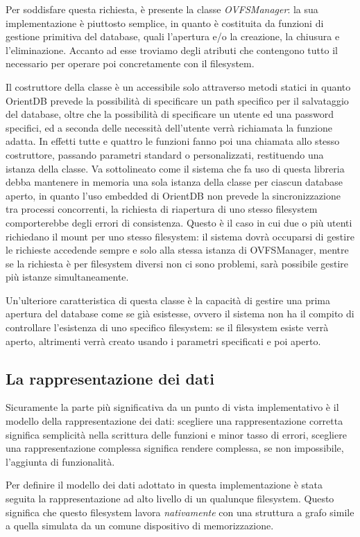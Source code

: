 Per soddisfare questa richiesta, è presente la classe \emph{OVFSManager}: la sua implementazione è piuttosto semplice, in quanto è costituita da funzioni di gestione primitiva del database, quali l'apertura e/o la creazione, la chiusura e l'eliminazione. Accanto ad esse troviamo degli atributi che contengono tutto il necessario per operare poi concretamente con il filesystem.

Il costruttore della classe è un accessibile solo attraverso metodi statici in quanto OrientDB prevede la possibilità di specificare un path specifico per il salvataggio del database, oltre che la possibilità di specificare un utente ed una password specifici, ed a seconda delle necessità dell'utente verrà richiamata la funzione adatta. In effetti tutte e quattro le funzioni fanno poi una chiamata allo stesso costruttore, passando parametri standard o personalizzati, restituendo una istanza della classe. Va sottolineato come il sistema che fa uso di questa libreria debba mantenere in memoria una sola istanza della classe per ciascun database aperto, in quanto l'uso embedded di OrientDB non prevede la sincronizzazione tra processi concorrenti, la richiesta di riapertura di uno stesso filesystem comporterebbe degli errori di consistenza. Questo è il caso in cui due o più utenti richiedano il mount per uno stesso filesystem: il sistema dovrà occuparsi di gestire le richieste accedende sempre e solo alla stessa istanza di OVFSManager, mentre se la richiesta è per filesystem diversi non ci sono problemi, sarà possibile gestire più istanze simultaneamente.

Un'ulteriore caratteristica di questa classe è la capacità di gestire una prima apertura del database come se già esistesse, ovvero il sistema non ha il compito di controllare l'esistenza di uno specifico filesystem: se il filesystem esiste verrà aperto, altrimenti verrà creato usando i parametri specificati e poi aperto.

\subsection {La rappresentazione dei dati}
Sicuramente la parte più significativa da un punto di vista implementativo è il modello della rappresentazione dei dati: scegliere una rappresentazione corretta significa semplicità nella scrittura delle funzioni e minor tasso di errori, scegliere una rappresentazione complessa significa rendere complessa, se non impossibile, l'aggiunta di funzionalità.

Per definire il modello dei dati adottato in questa implementazione è stata seguita la rappresentazione ad alto livello di un qualunque filesystem. Questo significa che questo filesystem lavora \emph{nativamente} con una struttura a grafo simile a quella simulata da un comune dispositivo di memorizzazione.

